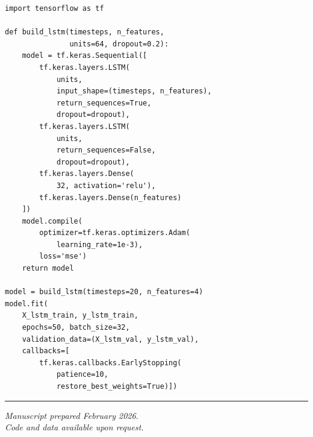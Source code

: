 \documentclass[11pt,a4paper,twocolumn]{article}
\begin{document}
\begin{lstlisting}[caption={Stacked LSTM model definition.}]
import tensorflow as tf

def build_lstm(timesteps, n_features,
               units=64, dropout=0.2):
    model = tf.keras.Sequential([
        tf.keras.layers.LSTM(
            units,
            input_shape=(timesteps, n_features),
            return_sequences=True,
            dropout=dropout),
        tf.keras.layers.LSTM(
            units,
            return_sequences=False,
            dropout=dropout),
        tf.keras.layers.Dense(
            32, activation='relu'),
        tf.keras.layers.Dense(n_features)
    ])
    model.compile(
        optimizer=tf.keras.optimizers.Adam(
            learning_rate=1e-3),
        loss='mse')
    return model

model = build_lstm(timesteps=20, n_features=4)
model.fit(
    X_lstm_train, y_lstm_train,
    epochs=50, batch_size=32,
    validation_data=(X_lstm_val, y_lstm_val),
    callbacks=[
        tf.keras.callbacks.EarlyStopping(
            patience=10,
            restore_best_weights=True)])
\end{lstlisting}

\vspace{12pt}
\noindent\rule{\columnwidth}{0.4pt}
\begin{center}
\small\textit{Manuscript prepared February 2026.\\
Code and data available upon request.}
\end{center}
\end{document}
